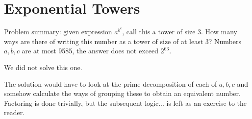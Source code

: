 \section{Exponential Towers}

Problem summary: given expression $a^{b^c}$, call this a tower of size 3. How
many ways are there of writing this number as a tower of size of at least 3?
Numbers $a,b,c$ are at most 9585, the answer does not exceed $2^{63}$.

We did not solve this one.

The solution would have to look at the prime decomposition of each of $a,b,c$
and somehow calculate the ways of grouping these to obtain an equivalent number.
Factoring is done trivially, but the subsequent logic... is left as an exercise
to the reader.
